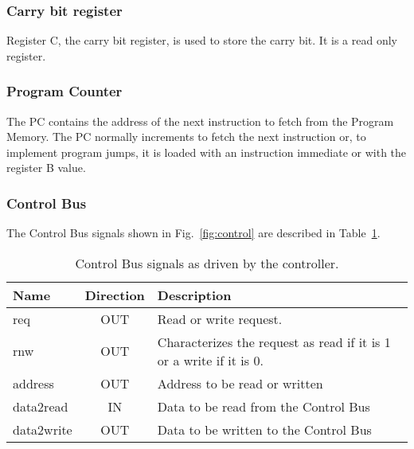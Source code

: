 \subsubsection{Carry bit register}

Register C, the carry bit register, is used to store the carry bit. It
is a read only register.

\subsubsection{Program Counter}

The PC contains the address of the next instruction to fetch from the
Program Memory. The PC normally increments to fetch the next
instruction or, to implement program jumps, it is loaded with an
instruction immediate or with the register B value.

\subsubsection{Control Bus}
\label{sec:rwbus}


The Control Bus signals shown in Fig.~\ref{fig:control} are described
in Table~\ref{tab:rwbus}.

\begin{table}[!htbp]
  \centering
    \begin{tabular}{|p{1.8cm}|c|p{10cm}|}
    \hline 
    {\bf Name} & {\bf Direction} & {\bf Description} \\
    \hline \hline 
     req & OUT & Read or write request.\\
    \hline
     rnw & OUT & Characterizes the request as read if it is 1 or a write if it is 0. \\
    \hline
     address & OUT & Address to be read or written \\
    \hline
     data2read & IN & Data to be read from the Control Bus \\
    \hline
     data2write & OUT & Data to be written to the Control Bus \\
    \hline

    \end{tabular}
  \caption{Control Bus signals as driven by the controller.}
  \label{tab:rwbus}
\end{table}

